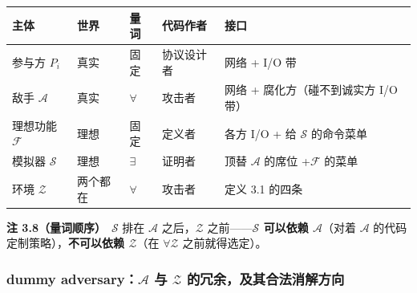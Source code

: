 \begin{longtable}[]{@{}
  >{\raggedright\arraybackslash}p{}
  >{\raggedright\arraybackslash}p{}
  >{\raggedright\arraybackslash}p{}
  >{\raggedright\arraybackslash}p{}
  >{\raggedright\arraybackslash}p{}@{}}
\toprule\noalign{}
\begin{minipage}[b]{\linewidth}\raggedright
主体
\end{minipage} & \begin{minipage}[b]{\linewidth}\raggedright
世界
\end{minipage} & \begin{minipage}[b]{\linewidth}\raggedright
量词
\end{minipage} & \begin{minipage}[b]{\linewidth}\raggedright
代码作者
\end{minipage} & \begin{minipage}[b]{\linewidth}\raggedright
接口
\end{minipage} \\
\midrule\noalign{}
\endhead
\bottomrule\noalign{}
\endlastfoot
参与方 $P_i$ & 真实 & 固定 & 协议设计者 & 网络 + I/O 带 \\
敌手 $\mathcal{A}$ & 真实 & $\forall$ & 攻击者 & 网络 +
腐化方（碰不到诚实方 I/O 带）\\
理想功能 $\mathcal{F}$ & 理想 & 固定 & 定义者 & 各方 I/O +
给 $\mathcal{S}$ 的命令菜单 \\
模拟器 $\mathcal{S}$ & 理想 & $\exists$ & 证明者 &
顶替 $\mathcal{A}$ 的席位 +$\mathcal{F}$ 的菜单 \\
环境 $\mathcal{Z}$ & 两个都在 & $\forall$ & 攻击者 & 定义 3.1
的四条 \\
\end{longtable}

\textbf{注
3.8（量词顺序）}　$\mathcal{S}$ 排在 $\mathcal{A}$ 之后，$\mathcal{Z}$ 之前------\textbf{$\mathcal{S}$ 可以依赖 $\mathcal{A}$}（对着 $\mathcal{A}$ 的代码定制策略），\textbf{不可以依赖 $\mathcal{Z}$}（在 $\forall \mathcal{Z}$ 之前就得选定）。

\subsubsection{\texorpdfstring{dummy adversary：$\mathcal{A}$ 与 $\mathcal{Z}$ 的冗余，及其合法消解方向}{dummy adversary：\textbackslash mathcal\{A\}与\textbackslash mathcal\{Z\}的冗余，及其合法消解方向}}

